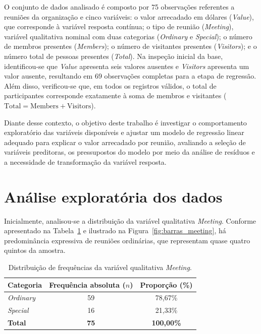 \documentclass[11pt,a4paper]{article}
\begin{document}
O conjunto de dados analisado é composto por 75 observações referentes a reuniões da organização e cinco variáveis: o valor arrecadado em dólares (\textit{Value}), que corresponde à variável resposta contínua; o tipo de reunião (\textit{Meeting}), variável qualitativa nominal com duas categorias (\textit{Ordinary} e \textit{Special}); o número de membros presentes (\textit{Members}); o número de visitantes presentes (\textit{Visitors}); e o número total de pessoas presentes (\textit{Total}). Na inspeção inicial da base, identificou-se que \textit{Value} apresenta seis valores ausentes e \textit{Visitors} apresenta um valor ausente, resultando em 69 observações completas para a etapa de regressão. Além disso, verificou-se que, em todos os registros válidos, o total de participantes corresponde exatamente à soma de membros e visitantes ($\text{Total} = \text{Members} + \text{Visitors}$).

Diante desse contexto, o objetivo deste trabalho é investigar o comportamento exploratório das variáveis disponíveis e ajustar um modelo de regressão linear adequado para explicar o valor arrecadado por reunião, avaliando a seleção de variáveis preditoras, os pressupostos do modelo por meio da análise de resíduos e a necessidade de transformação da variável resposta.

\section{Análise exploratória dos dados}

Inicialmente, analisou-se a distribuição da variável qualitativa \textit{Meeting}. Conforme apresentado na Tabela~\ref{tab:qualitativa} e ilustrado na Figura~\ref{fig:barras_meeting}, há predominância expressiva de reuniões ordinárias, que representam quase quatro quintos da amostra.

\begin{table}[H]
\centering
\caption{Distribuição de frequências da variável qualitativa \textit{Meeting}.}
\label{tab:qualitativa}
\begin{tabular}{lcc}
\toprule
\textbf{Categoria} & \textbf{Frequência absoluta ($n$)} & \textbf{Proporção (\%)} \\
\midrule
\textit{Ordinary} & 59 & 78,67\% \\
\textit{Special}  & 16 & 21,33\% \\
\midrule
\textbf{Total}    & \textbf{75} & \textbf{100,00\%} \\
\bottomrule
\end{tabular}
\end{table}
\end{document}
